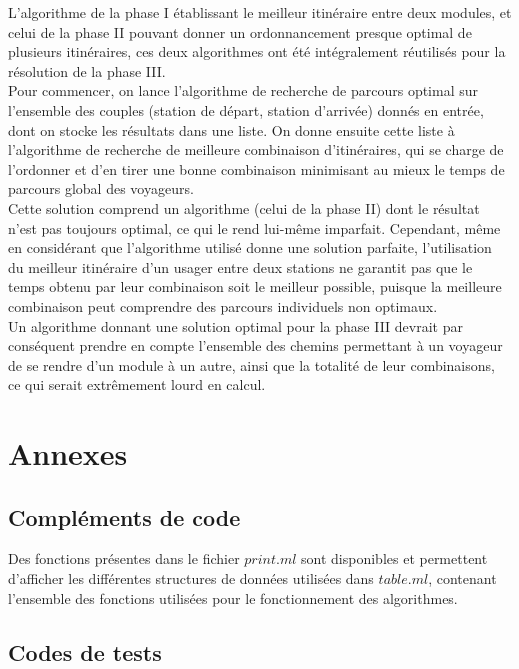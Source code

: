 \documentclass[11pt, a4paper, twoside, titlepage]{article}
\begin{document}
L'algorithme de la phase I établissant le meilleur itinéraire entre deux modules, et celui de la phase II pouvant donner un ordonnancement presque optimal de plusieurs itinéraires, ces deux algorithmes ont été intégralement réutilisés pour la résolution de la phase III.\\
Pour commencer, on lance l'algorithme de recherche de parcours optimal sur l'ensemble des couples (station de départ, station d'arrivée) donnés en entrée, dont on stocke les résultats dans une liste. On donne ensuite cette liste à l'algorithme de recherche de meilleure combinaison d'itinéraires, qui se charge de l'ordonner et d'en tirer une bonne combinaison minimisant au mieux le temps de parcours global des voyageurs.\\

Cette solution comprend un algorithme (celui de la phase II) dont le résultat n'est pas toujours optimal, ce qui le rend lui-même imparfait. Cependant, même en considérant que l'algorithme utilisé donne une solution parfaite, l'utilisation du meilleur itinéraire d'un usager entre deux stations ne garantit pas que le temps obtenu par leur combinaison soit le meilleur possible, puisque la meilleure combinaison peut comprendre des parcours individuels non optimaux.\\
Un algorithme donnant une solution optimal pour la phase III devrait par conséquent prendre en compte l'ensemble des chemins permettant à un voyageur de se rendre d'un module à un autre, ainsi que la totalité de leur combinaisons, ce qui serait extrêmement lourd en calcul.\\

\clearpage

\appendix
\section{Annexes}

\subsection{Compléments de code}

Des fonctions présentes dans le fichier $print.ml$ sont disponibles et permettent d'afficher les différentes structures de données utilisées dans $table.ml$, contenant l'ensemble des fonctions utilisées pour le fonctionnement des algorithmes.\\

\clearpage

\subsection{Codes de tests}
\end{document}
